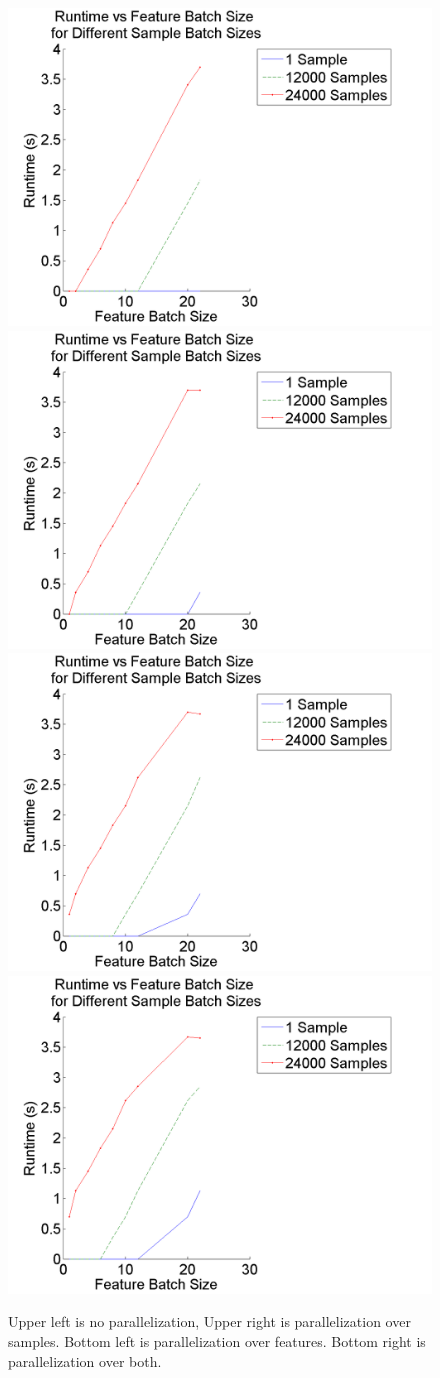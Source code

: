 \documentclass{article}
\begin{document}
\begin{figure}
\centering
\includegraphics[width = .4\linewidth]{feattimeplot5}
\includegraphics[width = .4\linewidth]{feattimeplot7}
\includegraphics[width = .4\linewidth]{feattimeplot9}
\includegraphics[width = .4\linewidth]{feattimeplot11}
\caption{Upper left is no parallelization, Upper right is parallelization over samples. Bottom left is parallelization over features. Bottom right is parallelization over both.}
\end{figure}
\end{document}

